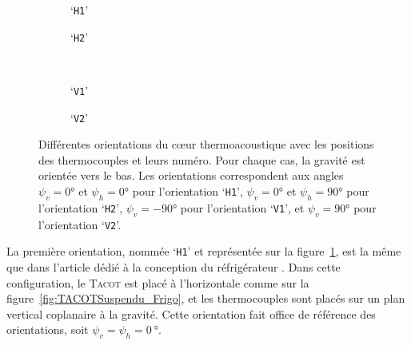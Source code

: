 \begin{figure}[!ht]
    \centering
	\begin{subfigure}[c]{.47\textwidth}
		\centering
		
		\caption{`\texttt{H1}'}
		\label{fig:OrientationCore_H1}
	\end{subfigure}		%
	\begin{subfigure}[c]{.47\textwidth}
		\centering
		
		\caption{`\texttt{H2}'}
		\label{fig:OrientationCore_H2}
	\end{subfigure} \\ \vspace{1cm}
	\begin{subfigure}[c]{.47\textwidth}
		\centering
		
		\caption{`\texttt{V1}'}
		\label{fig:OrientationCore_V1}
	\end{subfigure} %
	\begin{subfigure}[c]{.47\textwidth}
		\centering
		
		\caption{`\texttt{V2}'}
		\label{fig:OrientationCore_V2}
	\end{subfigure}   
    \caption{Différentes orientations du c\oe{}ur thermoacoustique avec les positions des thermocouples et leurs numéro. Pour chaque cas, la gravité est orientée vers le bas. Les orientations correspondent aux angles  $\psi_v=\ang{0}$ et $\psi_h=\ang{0}$ pour l'orientation `\texttt{H1}',  $\psi_v=\ang{0}$ et $\psi_h=\ang{+90}$ pour l'orientation `\texttt{H2}',  $\psi_v=\ang{-90}$ pour l'orientation `\texttt{V1}', et  $\psi_v=\ang{+90}$ pour l'orientation `\texttt{V2}'.}%
    \label{fig:OrientationCore} %
\end{figure}

\medskip

La première orientation, nommée `\texttt{H1}' et représentée sur la figure~\ref{fig:OrientationCore_H1}, est la même que dans l'article dédié à la conception du réfrigérateur \cite{ramadan_design_2021}. Dans cette configuration, le \textsc{Tacot} est placé à l'horizontale comme sur la figure~\ref{fig:TACOTSuspendu_Frigo}, et les thermocouples sont placés sur un plan vertical coplanaire à la gravité. Cette orientation fait office de référence des orientations, soit $\psi_v=\psi_h=\qty{0}{\degree}$.

